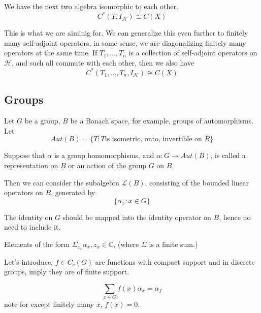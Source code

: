 \begin{proposition}
    We have the next two algebra isomorphic to each other.
    \begin{equation}
        C^*(T, I_\mathcal{H})\cong C(X)
    \end{equation}
\end{proposition}
This is what we are aiminig for. We can generalize this even further to finitely many self-adjoint operators, in some sense, we are diagonalizing finitely many operators at the same time. If $T_1,..., T_n$ is a collection of self-adjoint operators on $\mathcal{H}$, and such all commute with each other, then we also have
\begin{equation}
    C^*(T_1,..., T_n, I_\mathcal{H})\cong C(X)
\end{equation}

\subsection{Groups}

Let $G$ be a group, $B$ be a Banach space, for example, groups of automorphisms. Let
\begin{equation*} 
    Aut(B)=\{T:  T \text{is isometric, onto, invertible on } B\}
\end{equation*}

\begin{definition}
    Suppose that $\alpha$ is a group homomorphisms, and $\alpha: G\to Aut(B)$, is called a representation on $B$ or an action of the group $G$ on $B$.
\end{definition}


Then we can consider the subalgebra $\mathcal{L}(B)$, consisting of the bounded linear operators on $B$, generated by
\begin{equation*}
    \{\alpha_x:x\in G\}
\end{equation*}
\begin{remark}
    The identity on $G$ should be mapped into the identity operator on $B$, hence no need to include it.
\end{remark}

Elements of the form $\Sigma_{z_x}\alpha_x, z_x\in\mathbb{C}$, (where $\Sigma$ is a finite sum.)

Let's introduce,
$f\in C_c(G)$ are functions with compact support and in discrete groups, imply they are of finite support.

\begin{equation*}
    \sum_{x\in G}f(x)\alpha_x=\alpha_f
\end{equation*}
note for except finitely many $x$, $f(x)=0$.

